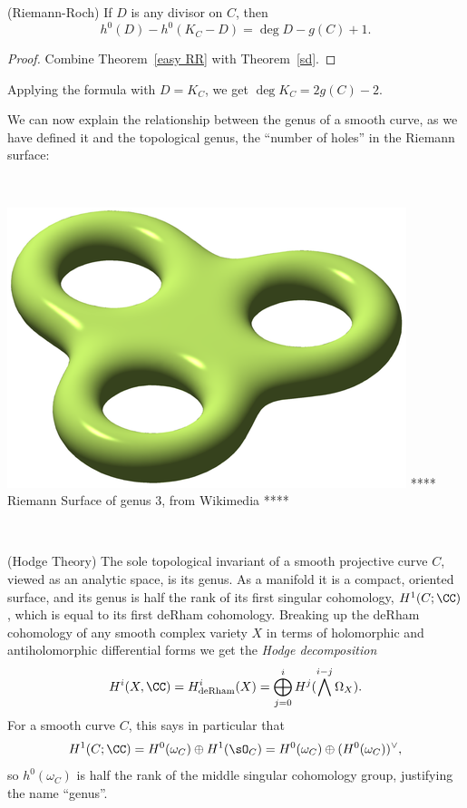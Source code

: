 \begin{theorem} (Riemann-Roch)\label{RR theorem}
If $D$ is any divisor on $C$, then 
$$
h^0(D) - h^0(K_C -D) = \deg D - g(C) +1.
$$
\end{theorem}

\begin{proof}
Combine Theorem~\ref{easy RR} with Theorem~\ref{sd}.
\end{proof}
Applying the formula with $D = K_C$, we get 
$\deg K_C = 2g(C) -2$.

We can now explain the relationship between the genus of a smooth curve, as we have defined it and the 
topological genus, the ``number of holes'' in the Riemann surface:

\

\includegraphics[scale = 1]{RiemannSurface}
**** Riemann Surface of genus 3, from Wikimedia ****

\

\begin{fact} (Hodge Theory)
The sole topological invariant of a smooth projective curve $C$, viewed as an analytic space, is its genus. As a manifold it is a compact, oriented surface, and its genus is half the rank of its first singular cohomology, $H^{1}(C; \CC)$, which is equal to its first deRham cohomology.
Breaking up the deRham cohomology of any smooth complex variety $X$ in terms of holomorphic and antiholomorphic differential
forms we get the \emph{Hodge decomposition}
$$
H^i(X,\CC) = H^i_{\rm de Rham}(X) = \bigoplus_{j=0}^i H^j(\bigwedge^{i-j} \Omega_X).
$$
For a smooth curve $C$, this says in  particular that
$$
H^1(C; \CC) = H^0(\omega_C)\oplus H^1(\sO_C) = H^0(\omega_C)\oplus (H^0(\omega_C))^\vee, 
$$
so $ h^0(\omega_C)$ is half the rank of the middle singular cohomology group, justifying the name ``genus''.
\end{fact}


